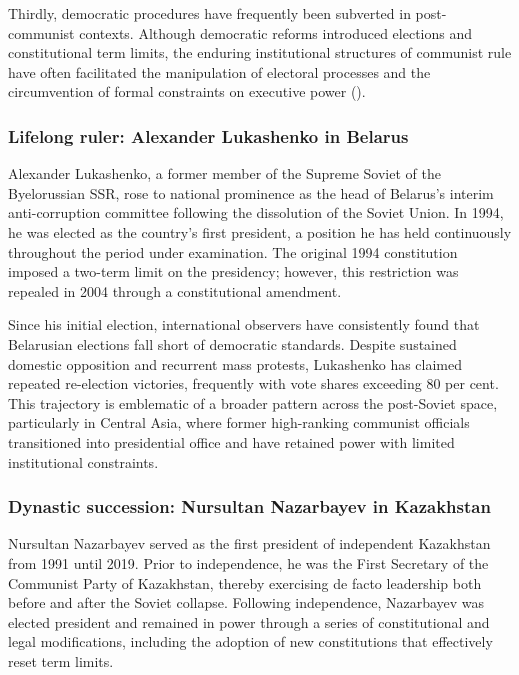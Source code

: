 \documentclass[
  12pt,
]{report}
\begin{document}
Thirdly, democratic procedures have frequently been subverted in
post-communist contexts. Although democratic reforms introduced
elections and constitutional term limits, the enduring institutional
structures of communist rule have often facilitated the manipulation of
electoral processes and the circumvention of formal constraints on
executive power ().

\subsubsection*{Lifelong ruler: Alexander Lukashenko in
Belarus}\label{lifelong-ruler-alexander-lukashenko-in-belarus}

Alexander Lukashenko, a former member of the Supreme Soviet of the
Byelorussian SSR, rose to national prominence as the head of Belarus's
interim anti-corruption committee following the dissolution of the
Soviet Union. In 1994, he was elected as the country's first president,
a position he has held continuously throughout the period under
examination. The original 1994 constitution imposed a two-term limit on
the presidency; however, this restriction was repealed in 2004 through a
constitutional amendment.

Since his initial election, international observers have consistently
found that Belarusian elections fall short of democratic standards.
Despite sustained domestic opposition and recurrent mass protests,
Lukashenko has claimed repeated re-election victories, frequently with
vote shares exceeding 80 per cent. This trajectory is emblematic of a
broader pattern across the post-Soviet space, particularly in Central
Asia, where former high-ranking communist officials transitioned into
presidential office and have retained power with limited institutional
constraints.

\subsubsection*{Dynastic succession: Nursultan Nazarbayev in
Kazakhstan}\label{dynastic-succession-nursultan-nazarbayev-in-kazakhstan}

Nursultan Nazarbayev served as the first president of independent
Kazakhstan from 1991 until 2019. Prior to independence, he was the First
Secretary of the Communist Party of Kazakhstan, thereby exercising de
facto leadership both before and after the Soviet collapse. Following
independence, Nazarbayev was elected president and remained in power
through a series of constitutional and legal modifications, including
the adoption of new constitutions that effectively reset term limits.
\end{document}
